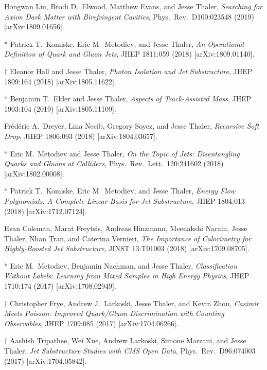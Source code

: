 \begin{list}{[]\addtocounter{jessecount}{-1}}{\leftmargin=3em \itemsep=4pt}
\item
 Hongwan Liu, Brodi D.\ Elwood, Matthew Evans, and Jesse Thaler,
\emph{Searching for Axion Dark Matter with Birefringent Cavities},
Phys.\ Rev.\ D100:023548 (2019)
[arXiv:1809.01656].

\item
* Patrick T.\ Komiske, Eric M.\ Metodiev, and Jesse Thaler,
\emph{An Operational Definition of Quark and Gluon Jets},
JHEP 1811:059 (2018)
[arXiv:1809.01140].

\item
$\dagger$ Eleanor Hall and Jesse Thaler,
\emph{Photon Isolation and Jet Substructure},
JHEP 1809:164 (2018)
[arXiv:1805.11622].

\item
* Benjamin T.\ Elder and Jesse Thaler,
\emph{Aspects of Track-Assisted Mass},
JHEP 1903:104 (2019)
[arXiv:1805.11109].

\item
 Frédéric A.\ Dreyer, Lina Necib, Gregory Soyez, and Jesse Thaler,
\emph{Recursive Soft Drop},
JHEP 1806:093 (2018)
[arXiv:1804.03657].

\item
* Eric M.\ Metodiev and Jesse Thaler,
\emph{On the Topic of Jets: Disentangling Quarks and Gluons at Colliders},
Phys.\ Rev.\ Lett.\ 120:241602 (2018)
[arXiv:1802.00008].

\item
* Patrick T.\ Komiske, Eric M.\ Metodiev, and Jesse Thaler,
\emph{Energy Flow Polynomials: A Complete Linear Basis for Jet Substructure},
JHEP 1804:013 (2018)
[arXiv:1712.07124].

\item
 Evan Coleman, Marat Freytsis, Andreas Hinzmann, Meenakshi Narain, Jesse Thaler, Nhan Tran, and Caterina Vernieri,
\emph{The Importance of Calorimetry for Highly-Boosted Jet Substructure},
JINST 13:T01003 (2018)
[arXiv:1709.08705].

\item
* Eric M.\ Metodiev, Benjamin Nachman, and Jesse Thaler,
\emph{Classification Without Labels: Learning from Mixed Samples in High Energy Physics},
JHEP 1710:174 (2017)
[arXiv:1708.02949].

\item
$\dagger$ Christopher Frye, Andrew J.\ Larkoski, Jesse Thaler, and Kevin Zhou,
\emph{Casimir Meets Poisson: Improved Quark/Gluon Discrimination with Counting Observables},
JHEP 1709:085 (2017)
[arXiv:1704.06266].

\item
$\dagger$ Aashish Tripathee, Wei Xue, Andrew Larkoski, Simone Marzani, and Jesse Thaler,
\emph{Jet Substructure Studies with CMS Open Data},
Phys.\ Rev.\ D96:074003 (2017)
[arXiv:1704.05842].


\end{list}

